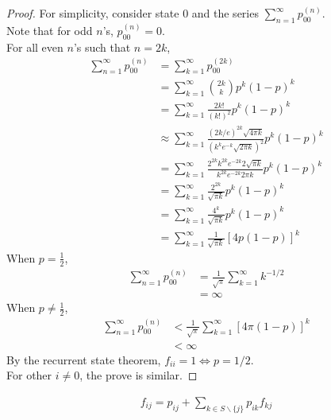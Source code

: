 \documentclass{article}
\newcommand{\upn}[0]{^{(n)}}
\begin{document}
    \begin{proof}
    	For simplicity, consider state $0$ and the series $\sum_{n=1}^\infty p_{00}\upn$. \\
    	Note that for odd $n$'s, $p_{00}\upn = 0$. \\
    	For all even $n$'s such that $n = 2k$,
    	\begin{align}
    		\sum_{n=1}^\infty p_{00}\upn &= \sum_{k=1}^\infty p_{00}^{(2k)} \\
    		&= \sum_{k=1}^\infty \binom{2k}{k}p^k (1-p)^k \\
    		&= \sum_{k=1}^\infty \frac{2k!}{(k!)^2} p^k (1-p)^k \\
    		&\approx \sum_{k=1}^\infty
    		\frac{(2k/e)^{2k}\sqrt{4 \pi k}}{(k^k e^{-k} \sqrt{2 \pi k})^2}
    		p^k (1-p)^k \\
    		&= \sum_{k=1}^\infty
    		\frac{2^{2k} k^{2k} e^{-2k} 2 \sqrt{\pi k}}
    		{k^{2k} e^{-2k} 2 \pi k}
    		p^k (1-p)^k \\
    		&= \sum_{k=1}^\infty
    		\frac{2^{2k}}
    		{\sqrt{\pi k}}
    		p^k (1-p)^k \\
    		&= \sum_{k=1}^\infty
    		\frac{4^k}
    		{\sqrt{\pi k}}
    		p^k (1-p)^k \\
    		&= \sum_{k=1}^\infty
    		\frac{1}
    		{\sqrt{\pi k}}
    		[4p(1-p)]^k
    	\end{align}
    	When $p = \frac{1}{2}$, 
    	\begin{align}
    		\sum_{n=1}^\infty p_{00}\upn &= \frac{1}{\sqrt{\pi}} \sum_{k=1}^\infty k^{-1/2} \\
    		&= \infty
    	\end{align}
    	When $p \neq \frac{1}{2}$,
    	\begin{align}
    		\sum_{n=1}^\infty p_{00}\upn &< \frac{1}{\sqrt{\pi}} \sum_{k=1}^\infty [4 \pi (1 - p)]^k \\
    		&< \infty
    	\end{align}
    	By the recurrent state theorem, $f_{ii} = 1 \iff p = 1/2$. \\
    	For other $i \neq 0$, the prove is similar.
    \end{proof}
    
    \begin{theorem}[f-Expansion]
    	\begin{align}
    		f_{ij} = p_{ij} + \sum_{k \in S \backslash \{j\}} p_{ik} f_{kj}
    	\end{align}
    \end{theorem}
    
\end{document}
